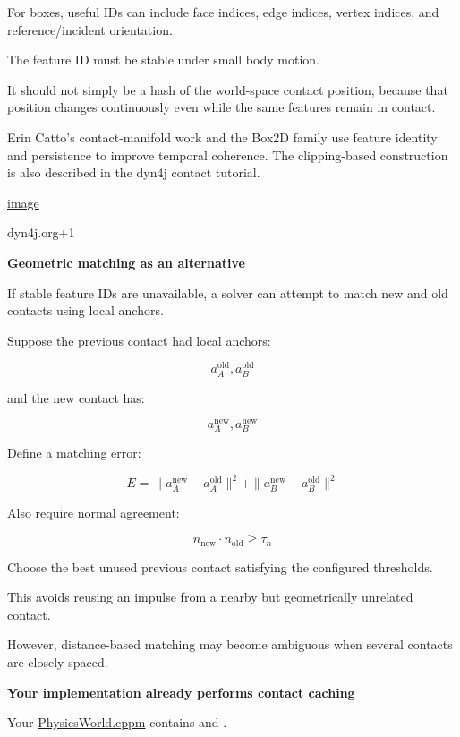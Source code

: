 For boxes, useful IDs can include face indices, edge indices, vertex indices, and reference/incident orientation.

The feature ID must be stable under small body motion.

It should not simply be a hash of the world-space contact position, because that position changes continuously even while the same features remain in contact.

Erin Catto's contact-manifold work and the Box2D family use feature identity and persistence to improve temporal coherence. The clipping-based construction is also described in the dyn4j contact tutorial. 

\href{https://www.google.com/s2/favicons?domain=https://dyn4j.org&sz=32}{image}

dyn4j.org+1

\textbf{Geometric matching as an alternative}

If stable feature IDs are unavailable, a solver can attempt to match new and old contacts using local anchors.

Suppose the previous contact had local anchors:

\[
a_A^{\mathrm{old}},a_B^{\mathrm{old}}
\]

and the new contact has:

\[
a_A^{\mathrm{new}},a_B^{\mathrm{new}}
\]

Define a matching error:

\[
\boxed{ E= \|a_A^{\mathrm{new}}-a_A^{\mathrm{old}}\|^2+ \|a_B^{\mathrm{new}}-a_B^{\mathrm{old}}\|^2 }
\]

Also require normal agreement:

\[
\boxed{ n_{\mathrm{new}}\cdot n_{\mathrm{old}}\ge\tau_n }
\]

Choose the best unused previous contact satisfying the configured thresholds.

This avoids reusing an impulse from a nearby but geometrically unrelated contact.

However, distance-based matching may become ambiguous when several contacts are closely spaced.

\textbf{Your implementation already performs contact caching}

Your \href{https://github.com/swayam8624/KairoPhysicsEngine/blob/main/PhysicsWorld.cppm?utm_source=chatgpt.com}{PhysicsWorld.cppm} contains  and .

